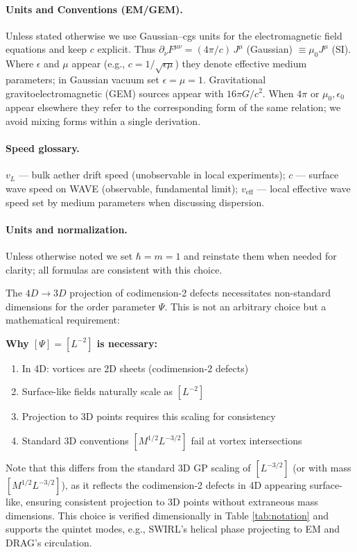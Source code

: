 \paragraph{Units and Conventions (EM/GEM).} Unless stated otherwise we use Gaussian--cgs units for the electromagnetic field equations and keep $c$ explicit. Thus $\partial_\nu F^{\mu\nu} = (4\pi/c)\, J^\mu$ (Gaussian) $\equiv \mu_0 J^\mu$ (SI). Where $\epsilon$ and $\mu$ appear (e.g., $c = 1/\sqrt{\epsilon\mu}$) they denote effective medium parameters; in Gaussian vacuum set $\epsilon=\mu=1$. Gravitational gravitoelectromagnetic (GEM) sources appear with $16\pi G/c^2$. When $4\pi$ or $\mu_0,\epsilon_0$ appear elsewhere they refer to the corresponding form of the same relation; we avoid mixing forms within a single derivation.

\paragraph{Speed glossary.} $v_L$ --- bulk aether drift speed (unobservable in local experiments); $c$ --- surface wave speed on WAVE (observable, fundamental limit); $v_{\text{eff}}$ --- local effective wave speed set by medium parameters when discussing dispersion.

\paragraph{Units and normalization.} Unless otherwise noted we set $\hbar=m=1$ and reinstate them when needed for clarity; all formulas are consistent with this choice.

The $4D\to3D$ projection of codimension-2 defects necessitates non-standard dimensions for the order parameter $\Psi$. This is not an arbitrary choice but a mathematical requirement:

\textbf{Why $[\Psi] = [L^{-2}]$ is necessary:}
\begin{enumerate}
\item In 4D: vortices are 2D sheets (codimension-2 defects)
\item Surface-like fields naturally scale as $[L^{-2}]$
\item Projection to 3D points requires this scaling for consistency
\item Standard 3D conventions $[M^{1/2} L^{-3/2}]$ fail at vortex intersections
\end{enumerate}

Note that this differs from the standard 3D GP scaling of $[L^{-3/2}]$ (or with mass $[M^{1/2} L^{-3/2}]$), as it reflects the codimension-2 defects in 4D appearing surface-like, ensuring consistent projection to 3D points without extraneous mass dimensions. This choice is verified dimensionally in Table \ref{tab:notation} and supports the quintet modes, e.g., SWIRL's helical phase projecting to EM and DRAG's circulation.

